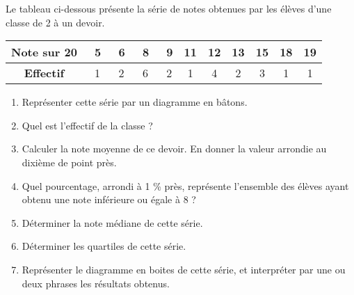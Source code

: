 
\begin{exercice}\label{exosmath-0147}

    Le tableau ci-dessous présente la série de notes obtenues par les
élèves d'une classe de 2  à un devoir.

\begin{center}
  \begin{tabular}{|c|*{10}{c|}}
    \hline
    \textbf{Note sur 20} & \ 5&\ 6&\ 8&\ 9&11&12&13&15&18&19 \\
    \hline
    \textbf{Effectif} & \ 1&\ 2&\ 6&\ 2&1&4&2&3&1&1 \\
    \hline
  \end{tabular}
\end{center}
\medskip

\begin{enumerate}
\item Représenter cette série par un diagramme en bâtons.
\item Quel est l'effectif de la classe ?
\item Calculer la note moyenne de ce devoir. En donner la valeur
  arrondie au dixième de point près.
\item Quel pourcentage, arrondi à 1 \% près, représente l'ensemble des
  élèves ayant obtenu une note inférieure ou égale à 8 ?
\item Déterminer la note médiane de cette série.
\item Déterminer les quartiles de cette série.
\item Représenter le diagramme en boites de cette série, et
  interpréter par une ou deux phrases les résultats obtenus.
\end{enumerate}



\end{exercice}
